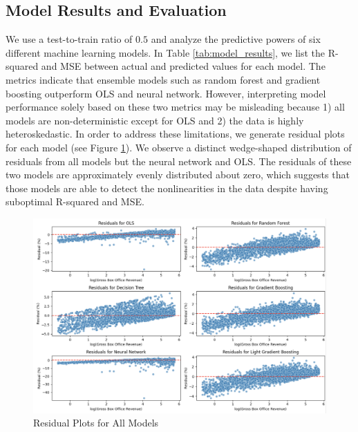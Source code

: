 \documentclass{article}
\begin{document}
\subsection{Model Results and Evaluation}
We use a test-to-train ratio of $0.5$ and analyze the predictive powers of six different machine learning models. In Table \ref{tab:model_results}, we list the R-squared and MSE between actual and predicted values for each model. The metrics indicate that ensemble models such as random forest and gradient boosting outperform OLS and neural network. However, interpreting model performance solely based on these two metrics may be misleading because 1) all models are non-deterministic except for OLS and 2) the data is highly heteroskedastic. In order to address these limitations, we generate residual plots for each model (see Figure \ref{fig:residuals}). We observe a distinct wedge-shaped distribution of residuals from all models but the neural network and OLS. The residuals of these two models are approximately evenly distributed about zero, which suggests that those models are able to detect the nonlinearities in the data despite having suboptimal R-squared and MSE.

\begin{figure}[H]
    \centering
    \includegraphics[width=1\textwidth]{Residuals.png}
    \caption{Residual Plots for All Models}
    \label{fig:residuals}
\end{figure} 
\end{document}
